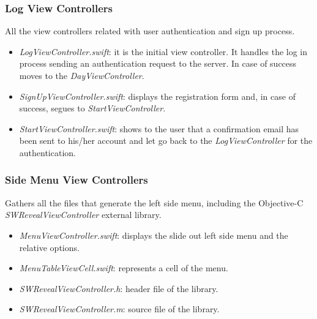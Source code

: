 \subsubsection*{Log View Controllers}
All the view controllers related with user authentication and sign up process.
\begin{itemize}
	\item \textit{LogViewController.swift}: it is the initial view controller. It handles the log in process sending an authentication request to the server. In case of success moves to the \textit{DayViewController}.
	\item \textit{SignUpViewController.swift}: displays the registration form and, in case of success, segues to \textit{StartViewController}.
	\item \textit{StartViewController.swift}: shows to the user that a confirmation email has been sent to his/her account and let go back to the \textit{LogViewController} for the authentication.
\end{itemize} 

\subsubsection*{Side Menu View Controllers}
Gathers all the files that generate the left side menu, including the Objective-C \textit{SWRevealViewController} external library.
\begin{itemize}
	\item \textit{MenuViewController.swift}: displays the slide out left side menu and the relative options.
	\item \textit{MenuTableViewCell.swift}: represents a cell of the menu.
	\item \textit{SWRevealViewController.h}: header file of the library.
		\item \textit{SWRevealViewController.m}: source file of the library.
\end{itemize}

